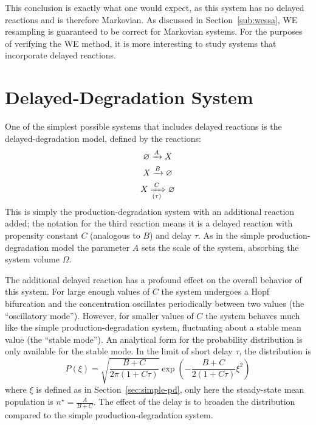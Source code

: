 \documentclass[english,letterpaper,12pt]{report}
\begin{document}
\begin{doublespacing}
This conclusion is exactly what one would expect, as this system has no delayed reactions and is therefore Markovian. As discussed in Section~\ref{sub:wessa}, WE resampling is guaranteed to be correct for Markovian systems. For the purposes of verifying the WE method, it is more interesting to study systems that incorporate delayed reactions.



\section{Delayed-Degradation System} %
\label{sec:delayed-deg}

One of the simplest possible systems that includes delayed reactions is the delayed-degradation model, defined by the reactions:
\begin{align}
    \begin{gathered}
        \varnothing \xrightarrow{A} X \\
        X \xrightarrow {B} \varnothing \\
        X \xRightarrow[(\tau)]{C} \varnothing
    \end{gathered}
    \label{eq:delayed-deg-rxns}
\end{align}
This is simply the production-degradation system with an additional reaction added; the notation for the third reaction means it is a delayed reaction with propensity constant $C$ (analogous to $B$) and delay $\tau$. As in the simple production-degradation model the parameter $A$ sets the scale of the system, absorbing the system volume $\Omega$.

The additional delayed reaction has a profound effect on the overall behavior of this system. For large enough values of $C$ the system undergoes a Hopf bifurcation and the concentration oscillates periodically between two values (the ``oscillatory mode''). However, for smaller values of $C$ the system behaves much like the simple production-degradation system, fluctuating about a stable mean value (the ``stable mode''). An analytical form for the probability distribution is only available for the stable mode. In the limit of short delay $\tau$, the distribution is \cite{delayed-deg-notes}
\begin{equation}
    P(\xi) = \sqrt{\frac{B + C}{2\pi(1 + C\tau)}}\exp\left( -\frac{B + C}{2(1 + C\tau)} \xi^2 \right)
    \label{eq:dd-analytic-dist}
\end{equation}
where $\xi$ is defined as in Section~\ref{sec:simple-pd}, only here the steady-state mean population is $n^\star = \frac{A}{B + C}$. The effect of the delay is to broaden the distribution compared to the simple production-degradation system.


\end{doublespacing}
\end{document}
